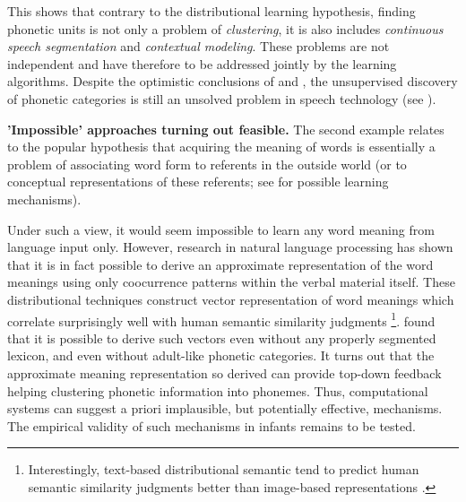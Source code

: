 \documentclass[jou,apacite]{apa6}
\renewcommand{\subsubsection}[1]{\textbf{#1}\hspace{0.3cm}}
\begin{document}
This shows that contrary to the  distributional learning hypothesis, finding phonetic units is not only a problem of \textit{clustering}, it is also includes \textit{continuous speech segmentation} and \textit{contextual modeling}. These problems are not independent and have therefore to be addressed jointly by the learning algorithms.  
Despite the optimistic conclusions of  and , the unsupervised discovery of phonetic categories is still an unsolved problem in speech technology (see ). %

\subsubsection{'Impossible' approaches turning out feasible.}\label{section:theorybenefit}
The second example relates to the popular hypothesis that acquiring the meaning of words is essentially a problem of associating word form to referents in the outside world (or to conceptual representations of these referents; see  for possible learning mechanisms). 

Under such a view, it would seem impossible to learn any word meaning from language input only. 
However, research in natural language processing has shown that it is in fact possible to derive an approximate representation of the word meanings using only coocurrence patterns within the verbal material itself. These distributional techniques \cite{landauer_1997,mikolov_2013} construct vector representation of word meanings  which correlate surprisingly well with human semantic similarity judgments \cite{turney_2010,baroni_2014}\footnote{Interestingly, text-based distributional semantic tend to predict human semantic similarity judgments better than image-based representations \cite{bruni_2012,kiela_2014,silberer_2016}.}.    found %
that it is possible to derive such vectors even without any properly segmented lexicon, and even without adult-like phonetic categories. It turns out that the approximate meaning representation so derived can provide top-down feedback helping clustering phonetic information into phonemes. Thus, computational systems can suggest a priori implausible, but potentially effective, mechanisms. The empirical validity of such mechanisms in infants remains to be tested.%
\end{document}
